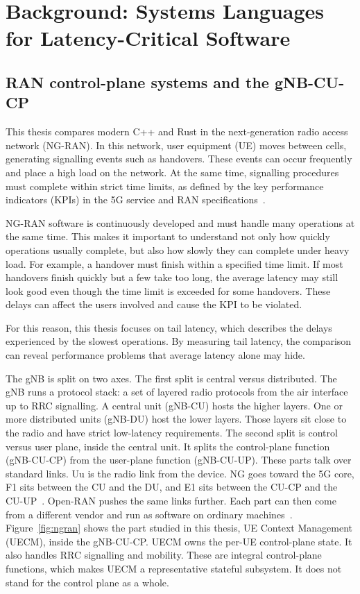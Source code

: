 \documentclass[english,oneside,a4paper,censored,csm,software-track-2020]{HYthesisML}
\begin{document}
\chapter{Background: Systems Languages for Latency-Critical Software\label{chapter:background}}

\section{RAN control-plane systems and the gNB-CU-CP}\label{sec:ranarch}
This thesis compares modern C++ and Rust in the next-generation radio access network (NG-RAN).
In this network, user equipment (UE) moves between cells, generating signalling events such as
handovers. These events can occur frequently and place a high load on the network. At the same
time, signalling procedures must complete within strict time limits, as defined by the key
performance indicators (KPIs) in the 5G service and RAN specifications~\cite{3gpp38913,3gpp22261}.

NG-RAN software is continuously developed and must handle many operations at the same time.
This makes it important to understand not only how quickly operations usually complete, but also
how slowly they can complete under heavy load. For example, a handover must finish within a
specified time limit. If most handovers finish quickly but a few take too long, the average
latency may still look good even though the time limit is exceeded for some handovers. These
delays can affect the users involved and cause the KPI to be violated.

For this reason, this thesis focuses on tail latency, which describes the delays experienced by
the slowest operations. By measuring tail latency, the comparison can reveal performance problems
that average latency alone may hide.

The gNB is split on two axes. The first split is central versus distributed.
The gNB runs a protocol stack: a set of layered radio protocols from the air
interface up to RRC signalling. A central unit (gNB-CU) hosts the higher layers.
One or more distributed units (gNB-DU) host the lower layers. Those layers sit close to
the radio and have strict low-latency requirements. The second split is control versus user
plane, inside the central unit. It splits the control-plane function
(gNB-CU-CP) from the user-plane function (gNB-CU-UP). These parts talk over
standard links. Uu is the radio link from the device. NG goes toward the 5G core, F1 sits between the CU and the DU,
and E1 sits between the CU-CP and the CU-UP~\cite{3gpp38401,3gpp38300,3gpp38463}.
Open-RAN pushes the same links further. Each part can then come from a
different vendor and run as software on ordinary
machines~\cite{polese2023oran}. Figure~\ref{fig:ngran} shows the part studied in this thesis, UE Context Management (UECM), inside the gNB-CU-CP. UECM owns the per-UE
control-plane state. It also handles RRC signalling and mobility. These are
integral control-plane functions, which makes UECM a representative stateful
subsystem. It does not stand for the control plane as a whole.
\end{document}
